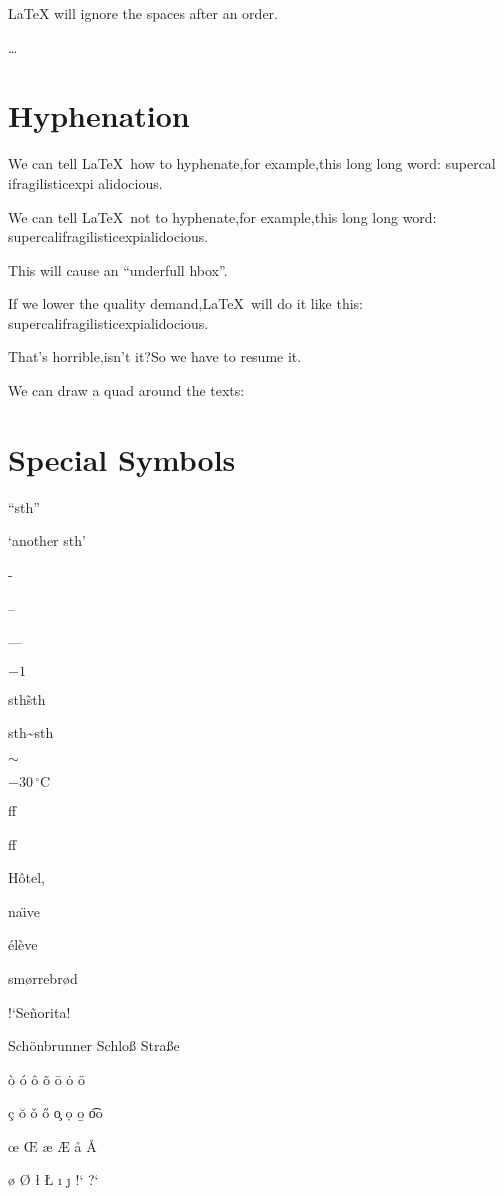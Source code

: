 \documentclass[a4paper]{report}
\begin{document}
\LaTeX{} will ignore the spaces after an order.

\ldots

\section{Hyphenation}

We can tell \LaTeX\ how to hyphenate,for example,this long long word: su\-per\-cal\-%
i\-frag\-i\-lis\-tic\-ex\-pi\-%
al\-i\-do\-cious.

We can tell \LaTeX\ not to hyphenate,for example,this long long
word: \mbox{supercalifragilisticexpialidocious}.

This will cause an ``underfull hbox''.

If we lower the quality demand,\LaTeX\ will do it like this:\sloppy
\mbox{supercalifragilisticexpialidocious}.

That's horrible,isn't it?So we have to resume it.\fussy

We can draw a quad around the
texts:

\section{Special Symbols}

``sth''

`another sth'

-

--

---

$-1$

sth\~ sth

sth\~{}sth

$\sim$

$-30\,^{\circ}\mathrm{C}$

ff

f\mbox{}f

H\^otel,

na\"\i ve

\'el\`eve

sm\o rrebr\o d

!`Se\~norita!

Sch\"onbrunner Schlo\ss{} Stra\ss e

\`o{} \'o{} \^o{} \~o{}  \=o{}  \.o{} \"o{}


\c c \u o \v o \H o \c o  \d o \b o \t oo

\oe{} \OE{} \ae{} \AE{} \aa{} \AA{}

\o{} \O{} \l{} \L{} \i{} \j{}
!`{} ?`
\end{document}
